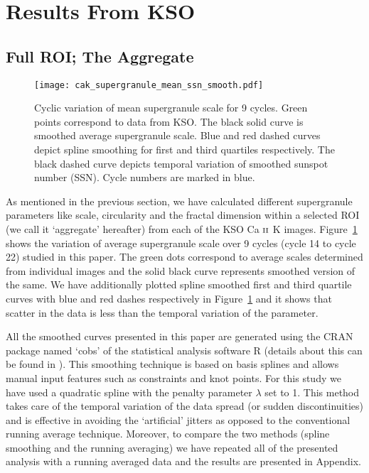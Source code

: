 \documentclass[manuscript]{aastex}	%
\begin{document}
   \section{Results From KSO} \label{sec:kresult}
   \subsection{Full ROI; The Aggregate}

  \begin{figure}[!htb]
  \centering
  \texttt{[image: cak\_supergranule\_mean\_ssn\_smooth.pdf]}
  \caption{Cyclic variation of mean supergranule scale for 9 cycles. Green points correspond to data from KSO.  The black solid curve is smoothed average supergranule scale. Blue and red dashed curves depict spline smoothing for first and third quartiles respectively. The black dashed curve depicts temporal variation of smoothed sunspot number (SSN). Cycle numbers are marked in blue.}
 \label{fig:supergranule_scale}
\end{figure} 
As mentioned in the previous section, we have calculated different supergranule parameters like scale, circularity and the fractal dimension within a selected ROI (we call it `aggregate' hereafter) from each of the KSO C\MakeLowercase{a}  $\scriptsize{{\textrm{II}}}$ K images. Figure~\ref{fig:supergranule_scale} shows the variation of average supergranule scale over 9 cycles (cycle 14 to cycle 22) studied in this paper. The green dots correspond to average scales determined from individual images and the solid black curve represents smoothed version of the same. We have additionally plotted spline smoothed first and third quartile curves with blue and red dashes respectively in Figure~\ref{fig:supergranule_scale} and it shows that scatter in the data is less than the temporal variation of the parameter.

All the smoothed curves presented in this paper are generated using the CRAN package named `cobs' of the statistical analysis software R (details about this can be found in \citet{feigelson2012modern}). This smoothing technique is based on basis splines \citep{Reinsch:1967:SSF:2715402.2715725} and allows manual input features such as constraints and knot points. For this study we have used a quadratic spline with the penalty parameter $\lambda$ \citep{hastie1990generalized} set to 1. This method takes care of the temporal variation of the data spread (or sudden discontinuities) and is effective in avoiding the `artificial' jitters as opposed to the conventional running average technique. Moreover, to compare the two methods (spline smoothing and the running averaging) we have repeated all of the presented analysis with a running averaged data and the results are presented in Appendix.
\end{document}
